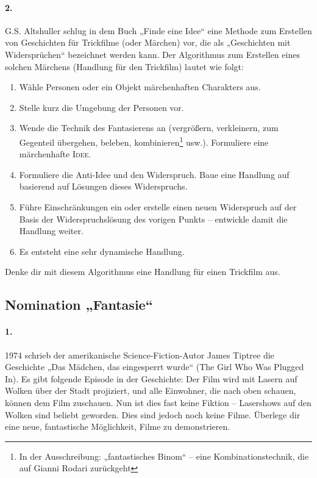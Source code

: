 \documentclass[11pt,a4paper]{article}
\begin{document}
\paragraph{2.}
G.S. Altshuller schlug in dem Buch „Finde eine Idee“ eine Methode zum
Erstellen von Geschichten für Trickfilme (oder Märchen) vor, die als
„Geschichten mit Widersprüchen“ bezeichnet werden kann.  Der Algorithmus zum
Erstellen eines solchen Märchens (Handlung für den Trickfilm) lautet wie
folgt:

\begin{enumerate}
\item Wähle Personen oder ein Objekt märchenhaften Charakters aus.
\item Stelle kurz die Umgebung der Personen vor.
\item Wende die Technik des Fantasierens an (vergrößern, verkleinern, zum
  Gegenteil übergehen, beleben, kombinieren\footnote{In der Ausschreibung:
    „fantastisches Binom“ -- eine Kombinationstechnik, die auf Gianni Rodari
    zurückgeht} usw.). Formuliere eine märchenhafte \textsc{Idee}.
\item Formuliere die Anti-Idee und den Widerspruch. Baue eine Handlung auf
  basierend auf Lösungen dieses Widerspruchs.
\item Führe Einschränkungen ein oder erstelle einen neuen Widerspruch auf der
  Basis der Widerspruchslösung des vorigen Punkts -- entwickle damit die
  Handlung weiter.
\item Es entsteht eine sehr dynamische Handlung.
\end{enumerate}
Denke dir mit diesem Algorithmus eine Handlung für einen Trickfilm aus.

\subsection*{Nomination „Fantasie“}

\paragraph{1.}
1974 schrieb der amerikanische Science-Fiction-Autor James Tiptree die
Geschichte „Das Mädchen, das eingesperrt wurde“ (The Girl Who Was Plugged In).
Es gibt folgende Episode in der Geschichte: Der Film wird mit Lasern auf
Wolken über der Stadt projiziert, und alle Einwohner, die nach oben schauen,
können dem Film zuschauen. Nun ist dies fast keine Fiktion -- Lasershows auf
den Wolken sind beliebt geworden. Dies sind jedoch noch keine Filme.  Überlege
dir eine neue, fantastische Möglichkeit, Filme zu demonstrieren.
\end{document}
